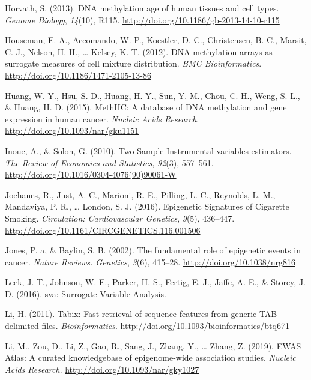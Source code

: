 \documentclass[11pt,twoside]{bristolthesis}
\newlength{\cslhangindent}
\newenvironment{cslreferences}%
  {\setlength{\parindent}{0pt}%
  \everypar{\setlength{\hangindent}{\cslhangindent}}\ignorespaces}%
  {\par}
\begin{document}
\begin{cslreferences}
\leavevmode\hypertarget{ref-Horvath2013}{}%
Horvath, S. (2013). DNA methylation age of human tissues and cell types. \emph{Genome Biology}, \emph{14}(10), R115. \url{http://doi.org/10.1186/gb-2013-14-10-r115}

\leavevmode\hypertarget{ref-Houseman2012}{}%
Houseman, E. A., Accomando, W. P., Koestler, D. C., Christensen, B. C., Marsit, C. J., Nelson, H. H., \ldots{} Kelsey, K. T. (2012). DNA methylation arrays as surrogate measures of cell mixture distribution. \emph{BMC Bioinformatics}. \url{http://doi.org/10.1186/1471-2105-13-86}

\leavevmode\hypertarget{ref-Huang2015}{}%
Huang, W. Y., Hsu, S. D., Huang, H. Y., Sun, Y. M., Chou, C. H., Weng, S. L., \& Huang, H. D. (2015). MethHC: A database of DNA methylation and gene expression in human cancer. \emph{Nucleic Acids Research}. \url{http://doi.org/10.1093/nar/gku1151}

\leavevmode\hypertarget{ref-Inoue2010}{}%
Inoue, A., \& Solon, G. (2010). Two-Sample Instrumental variables estimators. \emph{The Review of Economics and Statistics}, \emph{92}(3), 557--561. \url{http://doi.org/10.1016/0304-4076(90)90061-W}

\leavevmode\hypertarget{ref-Joehanes2016}{}%
Joehanes, R., Just, A. C., Marioni, R. E., Pilling, L. C., Reynolds, L. M., Mandaviya, P. R., \ldots{} London, S. J. (2016). Epigenetic Signatures of Cigarette Smoking. \emph{Circulation: Cardiovascular Genetics}, \emph{9}(5), 436--447. \url{http://doi.org/10.1161/CIRCGENETICS.116.001506}

\leavevmode\hypertarget{ref-Jones2002}{}%
Jones, P. a, \& Baylin, S. B. (2002). The fundamental role of epigenetic events in cancer. \emph{Nature Reviews. Genetics}, \emph{3}(6), 415--28. \url{http://doi.org/10.1038/nrg816}

\leavevmode\hypertarget{ref-Leek2016}{}%
Leek, J. T., Johnson, W. E., Parker, H. S., Fertig, E. J., Jaffe, A. E., \& Storey, J. D. (2016). sva: Surrogate Variable Analysis.

\leavevmode\hypertarget{ref-Li2011}{}%
Li, H. (2011). Tabix: Fast retrieval of sequence features from generic TAB-delimited files. \emph{Bioinformatics}. \url{http://doi.org/10.1093/bioinformatics/btq671}

\leavevmode\hypertarget{ref-Li2019}{}%
Li, M., Zou, D., Li, Z., Gao, R., Sang, J., Zhang, Y., \ldots{} Zhang, Z. (2019). EWAS Atlas: A curated knowledgebase of epigenome-wide association studies. \emph{Nucleic Acids Research}. \url{http://doi.org/10.1093/nar/gky1027}


\end{cslreferences}
\end{document}
